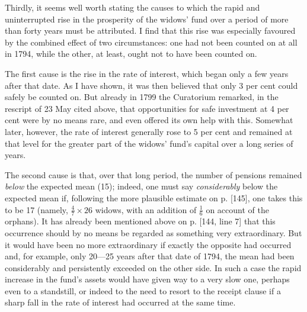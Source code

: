 Thirdly, it seems well worth stating the causes to which the rapid and uninterrupted rise in the prosperity of the widows' fund over a period of more than forty years must be attributed. I find that this rise was especially favoured by the combined effect of two circumstances: one had not been counted on at all in 1794, while the other, at least, ought not to have been counted on.

The first cause is the rise in the rate of interest, which began only a few years after that date. As I have shown, it was then believed that only 3 per cent could safely be counted on. But already in 1799 the Curatorium remarked, in the rescript of 23 May cited above, that opportunities for safe investment at 4 per cent were by no means rare, and even offered its own help with this. Somewhat later, however, the rate of interest generally rose to 5 per cent and remained at that level for the greater part of the widows' fund's capital over a long series of years.

The second cause is that, over that long period, the number of pensions remained \textit{below} the expected mean (15); indeed, one must say \textit{considerably} below the expected mean if, following the more plausible estimate on p. [145], one takes this to be 17 (namely, \(\tfrac{4}{7}\times26\) widows, with an addition of \(\tfrac{1}{6}\) on account of the orphans). It has already been mentioned above on p. [144, line 7] that this occurrence should by no means be regarded as something very extraordinary. But it would have been no more extraordinary if exactly the opposite had occurred and, for example, only 20—25 years after that date of 1794, the mean had been considerably and persistently exceeded on the other side. In such a case the rapid increase in the fund's assets would have given way to a very slow one, perhaps even to a standstill, or indeed to the need to resort to the receipt clause if a sharp fall in the rate of interest had occurred at the same time.


